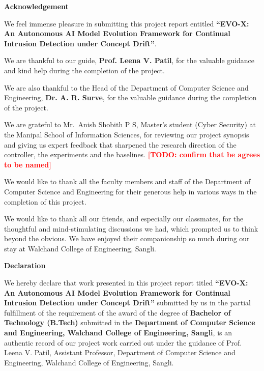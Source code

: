 \documentclass{article}
\newcommand{\todo}[1]{\textcolor{red}{\textbf{[TODO: #1]}}}
\begin{document}
	\pagebreak
	\begin{center}
	\Huge \textbf {\color {blue}Acknowledgement} \\
	\end{center}
	\vspace{1cm}
	{
	\onehalfspacing
	\setlength{\parindent}{2em}
	\setlength{\parskip}{0.8em}

We feel immense pleasure in submitting this project report entitled \textbf{``EVO-X: An Autonomous AI Model Evolution Framework for Continual Intrusion Detection under Concept Drift''}.

We are thankful to our guide, \textbf{Prof. Leena V. Patil}, for the valuable guidance and kind help during the completion of the project.

We are also thankful to the Head of the Department of Computer Science and Engineering, \textbf{Dr. A. R. Surve}, for the valuable guidance during the completion of the project.

We are grateful to Mr.\ Anish Shobith P S, Master's student (Cyber Security) at the Manipal School of Information Sciences, for reviewing our project synopsis and giving us expert feedback that sharpened the research direction of the controller, the experiments and the baselines. \todo{confirm that he agrees to be named}

We would like to thank all the faculty members and staff of the Department of Computer Science and Engineering for their generous help in various ways in the completion of this project.

We would like to thank all our friends, and especially our classmates, for the thoughtful and mind-stimulating discussions we had, which prompted us to think beyond the obvious. We have enjoyed their companionship so much during our stay at Walchand College of Engineering, Sangli.

	}

	\pagebreak
	\begin{center}
		\Huge \textbf{Declaration} \\
	\end{center}
	\vspace{1cm}
	\par
	\setlength{\parindent}{8em}
	\doublespacing
    \noindent
We hereby declare that work presented in this project report titled
\textbf {``EVO-X: An Autonomous AI Model Evolution Framework for Continual Intrusion Detection under Concept Drift''}
 submitted by us in the partial fulfillment of the requirement of the award of the degree of \textbf{Bachelor of Technology (B.Tech)} submitted in the \textbf{Department of Computer Science and Engineering, Walchand College of Engineering, Sangli}, is an authentic record of our project work carried out under the guidance of Prof. Leena V. Patil, Assistant Professor, Department of Computer Science and Engineering, Walchand College of Engineering, Sangli.
\end{document}
